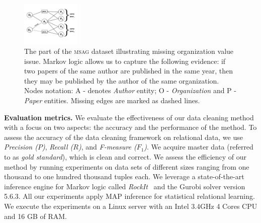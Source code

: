 \begin{figure}[t]
    \centering
    \includegraphics[width=0.25\textwidth, trim = 0mm 4mm 0mm 5mm, clip]{img/graph01.png}
    \caption{The part of the \textsc{msag} dataset illustrating missing organization value issue. Markov logic allows us to capture the following evidence: if two papers of the same author are published in the same year, then they may be published by the author of the same organization. Nodes notation: A - denotes \textit{Author} entity; O - \textit{Organization} and P - \textit{Paper} entities. Missing edges are marked as dashed lines.}
    \label{fig:msagmissing}
\end{figure}

\textbf{Evaluation metrics.} We evaluate the effectiveness of our data cleaning method with a focus on two aspects: the accuracy and the performance of the method. To assess the accuracy of the data cleaning framework on relational data, we use \textit{Precision ($P$)}, \textit{Recall ($R$)}, and \textit{F-measure ($F_1$)}. We acquire master data (referred to as \textit{gold standard}), which is clean and correct. We assess the efficiency of our method by running experiments on data sets of different sizes ranging from one thousand to one hundred thousand tuples each. We leverage a state-of-the-art inference engine for Markov logic called \textit{RockIt}~\cite{NoessnerNS13} and the Gurobi solver version 5.6.3. All our experiments apply MAP inference for statistical relational learning. We execute the experiments on a Linux server with an Intel 3.4GHz 4 Cores CPU and 16 GB of RAM.





